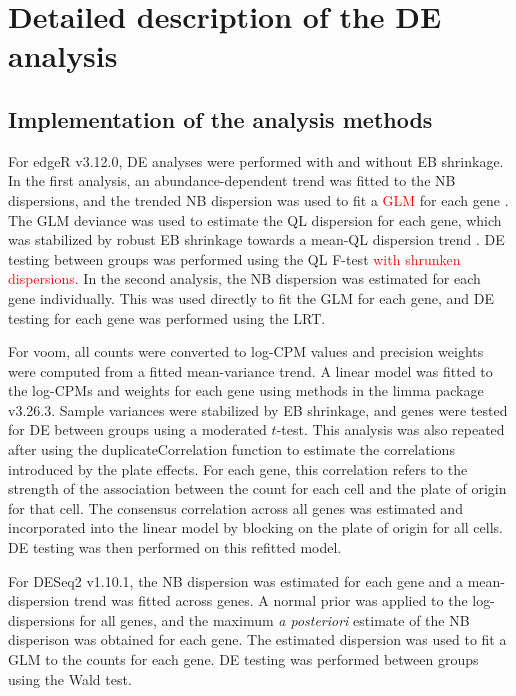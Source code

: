 \documentclass{article}
\newcommand\revised[1]{\textcolor{red}{#1}}
\begin{document}
\section{Detailed description of the DE analysis}

\subsection{Implementation of the analysis methods}
For edgeR v3.12.0, DE analyses were performed with and without EB shrinkage.
In the first analysis, an abundance-dependent trend was fitted to the NB dispersions, and the trended NB dispersion was used to fit a \revised{GLM} for each gene \citep{mccarthy2012differential}.
The GLM deviance was used to estimate the QL dispersion for each gene, which was stabilized by robust EB shrinkage towards a mean-QL dispersion trend \citep{lund2012detecting}.
DE testing between groups was performed using the QL F-test \revised{with shrunken dispersions}.
In the second analysis, the NB dispersion was estimated for each gene individually.
This was used directly to fit the GLM for each gene, and DE testing for each gene was performed using the LRT.

For voom, all counts were converted to log-CPM values and precision weights were computed from a fitted mean-variance trend.
A linear model was fitted to the log-CPMs and weights for each gene using methods in the limma package v3.26.3.
Sample variances were stabilized by EB shrinkage, and genes were tested for DE between groups using a moderated $t$-test.
This analysis was also repeated after using the duplicateCorrelation function \citep{smyth2005use} to estimate the correlations introduced by the plate effects.
For each gene, this correlation refers to the strength of the association between the count for each cell and the plate of origin for that cell.
The consensus correlation across all genes was estimated and incorporated into the linear model by blocking on the plate of origin for all cells.
DE testing was then performed on this refitted model.

For DESeq2 v1.10.1, the NB dispersion was estimated for each gene and a mean-dispersion trend was fitted across genes.
A normal prior was applied to the log-dispersions for all genes, and the maximum \textit{a posteriori} estimate of the NB disperison was obtained for each gene.
The estimated dispersion was used to fit a GLM to the counts for each gene.
DE testing was performed between groups using the Wald test.
\end{document}
